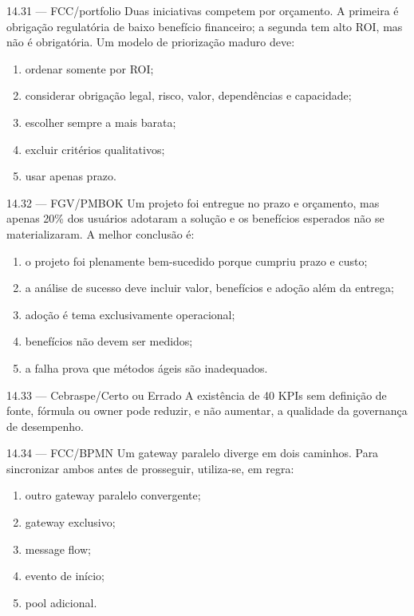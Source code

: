 \begin{questao}{ 14.31 — FCC/portfolio}
Duas iniciativas competem por orçamento. A primeira é obrigação regulatória de baixo benefício financeiro; a segunda tem alto ROI, mas não é obrigatória. Um modelo de priorização maduro deve:
\begin{enumerate}[label=\Alph*)]
\item ordenar somente por ROI;
\item considerar obrigação legal, risco, valor, dependências e capacidade;
\item escolher sempre a mais barata;
\item excluir critérios qualitativos;
\item usar apenas prazo.
\end{enumerate}
\end{questao}

\begin{questao}{ 14.32 — FGV/PMBOK}
Um projeto foi entregue no prazo e orçamento, mas apenas 20\% dos usuários adotaram a solução e os benefícios esperados não se materializaram. A melhor conclusão é:
\begin{enumerate}[label=\Alph*)]
\item o projeto foi plenamente bem-sucedido porque cumpriu prazo e custo;
\item a análise de sucesso deve incluir valor, benefícios e adoção além da entrega;
\item adoção é tema exclusivamente operacional;
\item benefícios não devem ser medidos;
\item a falha prova que métodos ágeis são inadequados.
\end{enumerate}
\end{questao}

\begin{questao}{ 14.33 — Cebraspe/Certo ou Errado}
A existência de 40 KPIs sem definição de fonte, fórmula ou owner pode reduzir, e não aumentar, a qualidade da governança de desempenho.
\end{questao}

\begin{questao}{ 14.34 — FCC/BPMN}
Um gateway paralelo diverge em dois caminhos. Para sincronizar ambos antes de prosseguir, utiliza-se, em regra:
\begin{enumerate}[label=\Alph*)]
\item outro gateway paralelo convergente;
\item gateway exclusivo;
\item message flow;
\item evento de início;
\item pool adicional.
\end{enumerate}
\end{questao}

